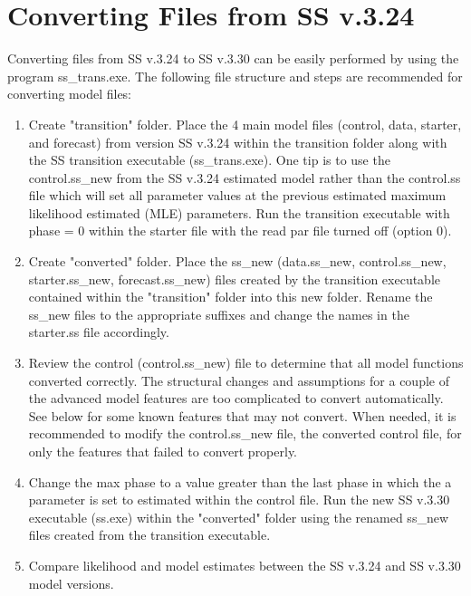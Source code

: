 \hypertarget{ConvIssues}{}
\section{Converting Files from SS v.3.24}
Converting files from SS v.3.24 to SS v.3.30 can be easily performed by using the program ss\_trans.exe. The following file structure and steps are recommended for converting model files:
\begin{enumerate}
	\item Create "transition" folder.  Place the 4 main model files (control, data, starter, and forecast) from version SS v.3.24 within the transition folder along with the SS transition executable (ss\_trans.exe).  One tip is to use the control.ss\_new from the SS v.3.24 estimated model rather than the control.ss file which will set all parameter values at the previous estimated maximum likelihood estimated (MLE) parameters.  Run the transition executable with phase = 0 within the starter file with the read par file turned off (option 0).
	
	\item Create "converted" folder.  Place the ss\_new (data.ss\_new, control.ss\_new, starter.ss\_new, forecast.ss\_new) files created by the transition executable contained within the "transition" folder into this new folder.  Rename the ss\_new files to the appropriate suffixes and change the names in the starter.ss file accordingly.
	
	\item Review the control (control.ss\_new) file to determine that all model functions converted correctly.  The structural changes and assumptions for a couple of the advanced model features are too complicated to convert automatically.  See below for some known features that may not convert. When needed, it is recommended to modify the control.ss\_new file, the converted control file, for only the features that failed to convert properly.
	
	\item Change the max phase to a value greater than the last phase in which the a parameter is set to estimated within the control file.  Run the new SS v.3.30 executable (ss.exe) within the "converted" folder using the renamed ss\_new files created from the transition executable.
	
	\item Compare likelihood and model estimates between the SS v.3.24 and SS v.3.30 model versions.
\end{enumerate}

